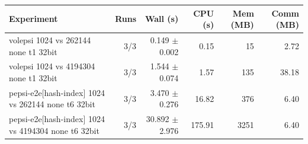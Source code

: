 \begin{tabular}{lrrrrr}
\toprule
Experiment & Runs & Wall (s) & CPU (s) & Mem (MB) & Comm (MB) \\
\midrule
volepsi 1024 vs 262144 none t1 32bit & 3/3 & 0.149 $\pm$ 0.002 & 0.15 & 15 & 2.72 \\
volepsi 1024 vs 4194304 none t1 32bit & 3/3 & 1.544 $\pm$ 0.074 & 1.57 & 135 & 38.18 \\
pepsi-e2e[hash-index] 1024 vs 262144 none t6 32bit & 3/3 & 3.470 $\pm$ 0.276 & 16.82 & 376 & 6.40 \\
pepsi-e2e[hash-index] 1024 vs 4194304 none t6 32bit & 3/3 & 30.892 $\pm$ 2.976 & 175.91 & 3251 & 6.40 \\
\bottomrule
\end{tabular}
